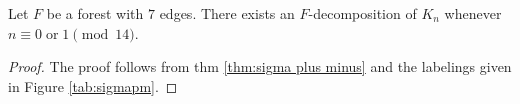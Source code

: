 \newpage


\begin{thm}\label{thm:0 or 1 mod 14}
    Let $F$ be a forest with $7$ edges. There exists an $F$-decomposition of $K_n$ whenever $n \equiv 0 \; \textrm{or} \; 1 \pmod{14}.$
\end{thm}
\begin{proof}
    The proof follows from thm \ref{thm:sigma plus minus} and the labelings given in Figure \ref{tab:sigmapm}.
\end{proof}